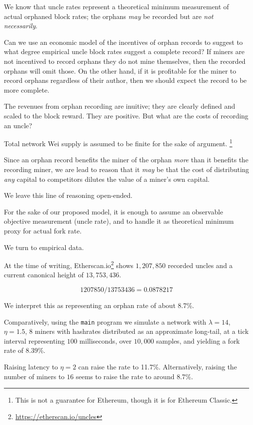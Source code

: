 \documentclass[11pt]{article}
\theoremstyle{plain}
\begin{document}
We know that uncle rates represent a theoretical minimum measurement of actual
orphaned block rates; the orphans \emph{may} be recorded but are \emph{not
necessarily}.

Can we use an economic model of the incentives of orphan records to suggest to
what degree empirical uncle block rates suggest a complete record?
If miners are not incentived to record orphans they do not mine themselves,
then the recorded orphans will omit those. On the other hand, if it is
profitable for the miner to record orphans regardless of their author, then we
should expect the record to be more complete.

The revenues from orphan recording are inuitive; they are clearly defined and
scaled to the block reward. They are positive. But what are the costs of
recording an uncle?

Total network Wei supply is assumed to be finite for the sake of
argument.\nolinebreak
\footnote{This is not a guarantee for Ethereum, though it is for Ethereum Classic.}

Since an orphan record benefits the miner of the orphan \emph{more} than it
benefits the recording miner, we are lead to reason that it \emph{may} be that the
cost of distributing \emph{any} capital to competitors dilutes the value of a
miner's own capital.

We leave this line of reasoning open-ended.

For the sake of our proposed model, it is enough to assume an observable
objective measurement (uncle rate), and to handle it as theoretical minimum
proxy for actual fork rate.

We turn to empirical data.

At the time of writing, Etherscan.io\footnote{\url{https://etherscan.io/uncles}}
shows $1,207,850$ recorded uncles and a current canonical height of $13,753,436$. 

\begin{equation}
  1207850 / 13753436 = 0.0878217
\end{equation}

We interpret this as representing an orphan rate of about 8.7\%. 

Comparatively, using the \texttt{main} program we simulate a network with
$\lambda=14$, $\eta=1.5$, $8$ miners with hashrates distributed as an
approximate long-tail, at a tick interval representing $100$ milliseconds, over
$10,000$ samples, and yielding a fork rate of 8.39\%. 

Raising latency to $\eta=2$ can raise the rate to 11.7\%.
Alternatively, raising the number of miners to $16$ seems to raise the rate to
around 8.7\%.
\end{document}
